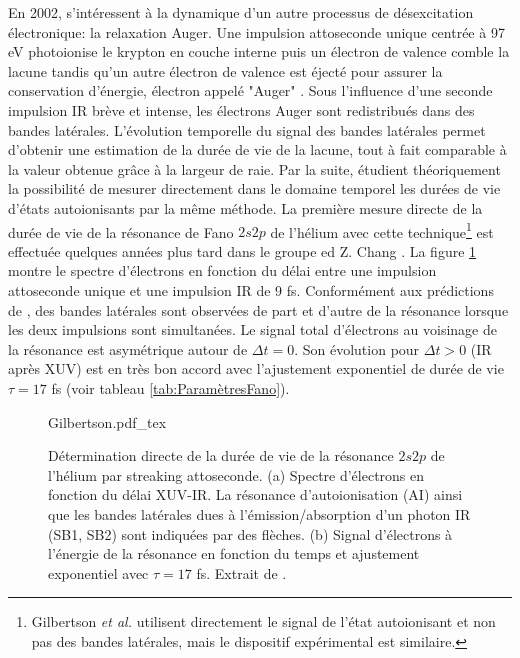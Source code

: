 En 2002,  s'intéressent à la dynamique d'un autre processus de désexcitation électronique: la relaxation Auger. Une impulsion attoseconde unique centrée à 97 eV photoionise le krypton en couche interne puis un électron de valence comble la lacune tandis qu'un autre électron de valence est éjecté pour assurer la conservation d'énergie, électron appelé "Auger" . Sous l'influence d'une seconde impulsion IR brève et intense, les électrons Auger sont redistribués dans des bandes latérales. L'évolution temporelle du signal des bandes latérales permet d'obtenir une estimation de la durée de vie de la lacune, tout à fait comparable à la valeur obtenue grâce à la largeur de raie. Par la suite,  étudient théoriquement la possibilité de mesurer directement dans le domaine temporel les durées de vie d'états autoionisants par la même méthode. La première mesure directe de la durée de vie de la résonance de Fano $2s2p$ de l'hélium avec cette technique\footnote{Gilbertson \textit{et al.} utilisent directement le signal de l'état autoionisant et non pas des bandes latérales, mais le dispositif expérimental est similaire.} est effectuée quelques années plus tard dans le groupe ed Z. Chang . La figure \ref{fig:Gilbertson} montre le spectre d'électrons en fonction du délai entre une impulsion attoseconde unique et une impulsion IR de 9 fs. Conformément aux prédictions de , des bandes latérales sont observées de part et d'autre de la résonance lorsque les deux impulsions sont simultanées. Le signal total d'électrons au voisinage de la résonance est asymétrique autour de $\Delta t = 0$. Son évolution pour $\Delta t > 0$ (IR après XUV) est en très bon accord avec l'ajustement exponentiel de durée de vie $\tau = 17$ fs (voir tableau \ref{tab:ParamètresFano}).

\begin{figure}
\centering
\def\svgwidth{0.9\textwidth}
{Gilbertson.pdf_tex}
\caption{Détermination directe de la durée de vie de la résonance $2s2p$ de l'hélium par streaking attoseconde. (a) Spectre d'électrons en fonction du délai XUV-IR. La résonance d'autoionisation (AI) ainsi que les bandes latérales dues à l'émission/absorption d'un photon IR (SB1, SB2) sont indiquées par des flèches. (b) Signal d'électrons à l'énergie de la résonance en fonction du temps et ajustement exponentiel avec $\tau = 17$ fs. Extrait de .}
\label{fig:Gilbertson}
\end{figure}

